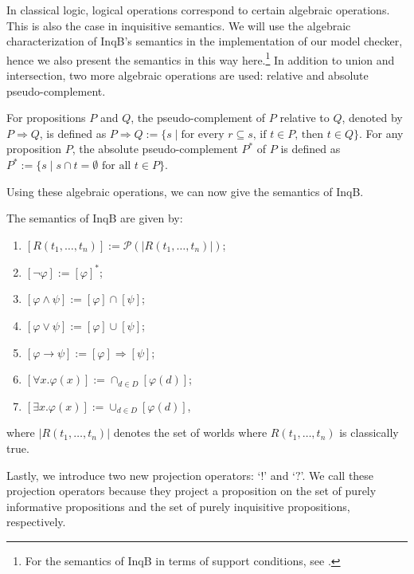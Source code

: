 In classical logic, logical operations correspond to certain algebraic operations. This is also the case in inquisitive semantics. We will use the algebraic characterization of \textsf{InqB}'s semantics in the implementation of our model checker, hence we also present the semantics in this way here.\footnote{For the semantics of \textsf{InqB} in terms of support conditions, see \cite[p.\ 62-63]{inquisitive19}.} In addition to union and intersection, two more algebraic operations are used: relative and absolute pseudo-complement.

\begin{defi}
 For propositions $P$ and $Q$, the pseudo-complement of $P$ relative to $Q$, denoted by $P\Rightarrow Q$, is defined as $P\Rightarrow Q:= \{s \mid \text{for every } r\subseteq s\text{, if } t\in P\text{, then } t\in Q\}$. For any proposition $P$, the absolute pseudo-complement $P^*$ of $P$ is defined as $P^*:=\{s\mid s\cap t=\emptyset \text{ for all } t\in P\}$.
\end{defi}
Using these algebraic operations, we can now give the semantics of \textsf{InqB}.

\begin{defi}\label{defsemantics}
 The semantics of \textsf{InqB} are given by:
 \begin{enumerate}\setlength\itemsep{-0.3em}
     \item $[R(t_1,\dots,t_n)] := \mathcal{P}(|R(t_1,\dots,t_n)|)$;
     \item $[\neg \varphi]:=[\varphi]^*$;
     \item $[\varphi\land\psi]:=[\varphi]\cap [\psi]$;
     \item $[\varphi\lor\psi]:=[\varphi]\cup [\psi]$;
     \item $[\varphi\rightarrow\psi]:=[\varphi]\Rightarrow [\psi]$;
     \item $[\forall x . \varphi(x)]:= \cap_{d\in D} [\varphi(d)]$;
     \item $[\exists x . \varphi(x)]:= \cup_{d\in D} [\varphi(d)]$,
 \end{enumerate}
 where $|R(t_1,\dots,t_n)|$ denotes the set of worlds where $R(t_1,\dots,t_n)$ is classically true.
\end{defi}
Lastly, we introduce two new projection operators: `$!$' and `$?$'. We call these projection operators because they project a proposition on the set of purely informative propositions and the set of purely inquisitive propositions, respectively.

